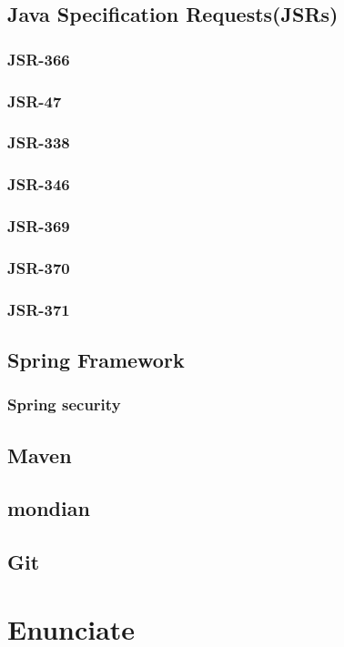	\subsection{Java Specification Requests(JSRs)}
		\subsubsection{JSR-366}
		\subsubsection{JSR-47}
		\subsubsection{JSR-338}
		\subsubsection{JSR-346}
		\subsubsection{JSR-369}
		\subsubsection{JSR-370}
		\subsubsection{JSR-371}
	\subsection{Spring Framework}
		\subsubsection{Spring security}
	\subsection{Maven}
	\subsection{mondian}
	\subsection{Git}
	\section{Enunciate}
